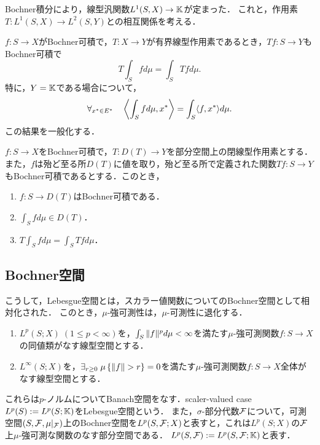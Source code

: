 \documentclass[uplatex,dvipdfmx]{jsreport}
\begin{document}
\begin{tcolorbox}[colframe=ForestGreen, colback=ForestGreen!10!white,breakable,colbacktitle=ForestGreen!40!white,coltitle=black,fonttitle=\bfseries\sffamily,
title=]
    Bochner積分により，線型汎関数$L^1(S,X)\to\mathbb{K}$が定まった．
    これと，作用素$T:L^1(S,X)\to L^2(S,Y)$との相互関係を考える．
\end{tcolorbox}

\begin{discussion}
    $f:S\to X$がBochner可積で，$T:X\to Y$が有界線型作用素であるとき，$Tf:S\to Y$もBochner可積で
    \[T\int_Sfd\mu=\int_STfd\mu.\]
    特に，$Y=\mathbb{K}$である場合について，
    \[\forall_{x^*\in E^*}\quad\left\langle\int_Sfd\mu,x^*\right\rangle=\int_S\langle f,x^*\rangle d\mu.\]
    この結果を一般化する．
\end{discussion}

\begin{theorem}[Hille]
    $f:S\to X$をBochner可積で，$T:D(T)\to Y$を部分空間上の閉線型作用素とする．また，$f$は殆ど至る所$D(T)$に値を取り，殆ど至る所で定義された関数$Tf:S\to Y$もBochner可積であるとする．このとき，
    \begin{enumerate}
        \item $f:S\to D(T)$はBochner可積である．
        \item $\int_Sfd\mu\in D(T)$．
        \item $T\int_Sfd\mu=\int_STfd\mu$．
    \end{enumerate}
\end{theorem}

\subsection{Bochner空間}

\begin{tcolorbox}[colframe=ForestGreen, colback=ForestGreen!10!white,breakable,colbacktitle=ForestGreen!40!white,coltitle=black,fonttitle=\bfseries\sffamily,
title=]
    こうして，Lebesgue空間とは，スカラー値関数についてのBochner空間として相対化された．
    このとき，$\mu$-強可測性は，$\mu$-可測性に退化する．
\end{tcolorbox}

\begin{definition}\mbox{}
    \begin{enumerate}
        \item $L^p(S;X)\;(1\le p<\infty)$を，$\int_S\|f\|^pd\mu<\infty$を満たす$\mu$-強可測関数$f:S\to X$の同値類がなす線型空間とする．
        \item $L^\infty(S;X)$を，$\exists_{r\ge0}\;\mu\Brace{\norm{f}>r}=0$を満たす$\mu$-強可測関数$f:S\to X$全体がなす線型空間とする．
    \end{enumerate}
    これらは$p$-ノルムについてBanach空間をなす．scaler-valued case $L^p(S):=L^p(S;\mathbb{K})$をLebesgue空間という．
    また，$\sigma$-部分代数$\mathcal{F}$について，可測空間$(S,\mathcal{F},\mu|_{\mathcal{F}})$上のBochner空間を$L^p(S,\mathcal{F};X)$と表すと，これは$L^p(S;X)$の$\mathcal{F}$上$\mu$-強可測な関数のなす部分空間である．
    $L^p(S,\mathcal{F}):=L^p(S,\mathcal{F};\mathbb{K})$と表す．
\end{definition}
\end{document}
